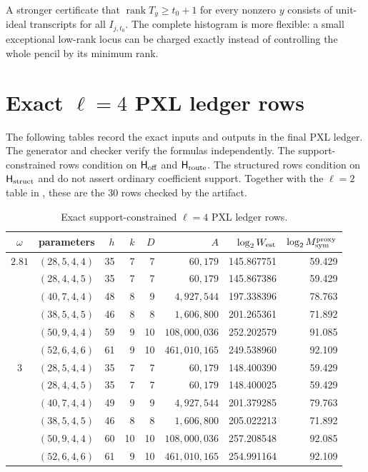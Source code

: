 \documentclass[11pt]{article}
\newcommand{\rank}{\operatorname{rank}}
\begin{document}
A stronger certificate that $\rank T_y\ge t_0+1$ for every nonzero $y$
consists of unit-ideal transcripts for all $I_{j,t_0}$.  The complete histogram is more
flexible: a small exceptional low-rank locus can be charged exactly instead of
controlling the whole pencil by its minimum rank.

\section{Exact \texorpdfstring{$\ell=4$}{ell=4} PXL ledger rows}
\label{app:pxl-ell4-ledger}
The following tables record the exact inputs and outputs in the final PXL
ledger.  The generator and checker verify the formulas independently.  The
support-constrained rows condition on
$\mathsf H_{\rm off}$ and $\mathsf H_{\rm route}$.  The structured rows
condition on $\mathsf H_{\rm struct}$ and do not assert ordinary coefficient
support.  Together with the $\ell=2$ table in , these are
the 30 rows checked by the artifact.

\begin{table}[H]
\centering
\caption{Exact support-constrained $\ell=4$ PXL ledger rows.}
\label{tab:pxl-l4-supported-ledger}
\scriptsize
\setlength{\tabcolsep}{3pt}
\begin{tabular}{@{}c l r r r r r r@{}}
\toprule
$\omega$ & parameters & $h$ & $k$ & $D$ & $A$ & $\log_2 W_{\rm est}$ & $\log_2 M_{\rm sym}^{\rm proxy}$\\
\midrule
$2.81$ & $(28,5,4,4)$ & 35 & 7 & 7 & $60{,}179$ & 145.867751 & 59.429\\
       & $(28,4,4,5)$ & 35 & 7 & 7 & $60{,}179$ & 145.867386 & 59.429\\
       & $(40,7,4,4)$ & 48 & 8 & 9 & $4{,}927{,}544$ & 197.338396 & 78.763\\
       & $(38,5,4,5)$ & 46 & 8 & 8 & $1{,}606{,}800$ & 201.265361 & 71.892\\
       & $(50,9,4,4)$ & 59 & 9 & 10 & $108{,}000{,}036$ & 252.202579 & 91.085\\
       & $(52,6,4,6)$ & 61 & 9 & 10 & $461{,}010{,}165$ & 249.538960 & 92.109\\
\midrule
$3$    & $(28,5,4,4)$ & 35 & 7 & 7 & $60{,}179$ & 148.400390 & 59.429\\
       & $(28,4,4,5)$ & 35 & 7 & 7 & $60{,}179$ & 148.400025 & 59.429\\
       & $(40,7,4,4)$ & 49 & 9 & 9 & $4{,}927{,}544$ & 201.379285 & 79.763\\
       & $(38,5,4,5)$ & 46 & 8 & 8 & $1{,}606{,}800$ & 205.022213 & 71.892\\
       & $(50,9,4,4)$ & 60 & 10 & 10 & $108{,}000{,}036$ & 257.208548 & 92.085\\
       & $(52,6,4,6)$ & 61 & 9 & 10 & $461{,}010{,}165$ & 254.991164 & 92.109\\
\bottomrule
\end{tabular}
\end{table}
\end{document}
